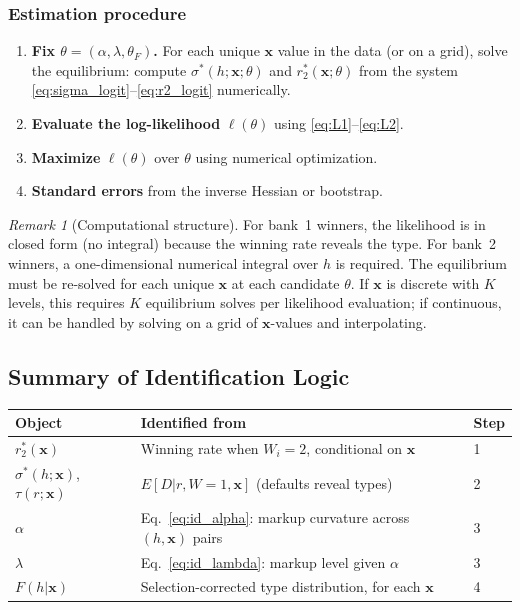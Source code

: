 \documentclass[12pt]{article}
\theoremstyle{plain}
\theoremstyle{plain}
\theoremstyle{definition}  %
\theoremstyle{remark}  %
\newtheorem{remark}[thm]{Remark}  %
\begin{document}
\subsubsection{Estimation procedure}

\begin{enumerate}
    \item \textbf{Fix $\theta = (\alpha, \lambda, \theta_F)$.} For each unique $\mathbf{x}$ value in the data (or on a grid), solve the equilibrium: compute $\sigma^*(h; \mathbf{x}; \theta)$ and $r_2^*(\mathbf{x};\theta)$ from the system \eqref{eq:sigma_logit}--\eqref{eq:r2_logit} numerically.
    \item \textbf{Evaluate the log-likelihood} $\ell(\theta)$ using \eqref{eq:L1}--\eqref{eq:L2}.
    \item \textbf{Maximize} $\ell(\theta)$ over $\theta$ using numerical optimization.
    \item \textbf{Standard errors} from the inverse Hessian or bootstrap.
\end{enumerate}

\begin{remark}[Computational structure]
For bank~1 winners, the likelihood is in closed form (no integral) because the winning rate reveals the type. For bank~2 winners, a one-dimensional numerical integral over $h$ is required. The equilibrium must be re-solved for each unique $\mathbf{x}$ at each candidate $\theta$. If $\mathbf{x}$ is discrete with $K$ levels, this requires $K$ equilibrium solves per likelihood evaluation; if continuous, it can be handled by solving on a grid of $\mathbf{x}$-values and interpolating.
\end{remark}


\subsection{Summary of Identification Logic}

\begin{center}
\renewcommand{\arraystretch}{1.4}
\begin{tabular}{lll}
\toprule
\textbf{Object} & \textbf{Identified from} & \textbf{Step} \\
\midrule
$r_2^*(\mathbf{x})$ & Winning rate when $W_i = 2$, conditional on $\mathbf{x}$ & 1 \\
$\sigma^*(h;\mathbf{x})$, $\tau(r;\mathbf{x})$ & $E[D|r, W\!=\!1, \mathbf{x}]$ (defaults reveal types) & 2 \\
$\alpha$ & Eq.\ \eqref{eq:id_alpha}: markup curvature across $(h,\mathbf{x})$ pairs & 3 \\
$\lambda$ & Eq.\ \eqref{eq:id_lambda}: markup level given $\alpha$ & 3 \\
$F(h|\mathbf{x})$ & Selection-corrected type distribution, for each $\mathbf{x}$ & 4 \\
\bottomrule
\end{tabular}
\end{center}
\end{document}
